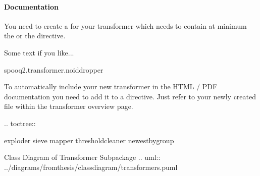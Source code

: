 \documentclass[a4paper,10pt, twoside,english]{sphinxmanual}
\begin{document}
\paragraph{Documentation}
\label{\detokenize{base_classes/transformer:documentation}}
You need to create a  for your transformer
which needs to contain at minimum the  or the  directive.
\def\sphinxLiteralBlockLabel{\label{\detokenize{base_classes/transformer:id4}}}
\begin{sphinxVerbatim}[commandchars=\\\{\}]

Some text if you like...

  spooq2.transformer.no\PYGZus{}id\PYGZus{}dropper
\end{sphinxVerbatim}

To automatically include your new transformer in the HTML / PDF documentation
you need to add it to a  directive. Just refer to your newly created
 file within the transformer overview page.
\def\sphinxLiteralBlockLabel{\label{\detokenize{base_classes/transformer:id5}}}
\begin{sphinxVerbatim}[commandchars=\\\{\}]
 .. toctree::

     exploder
     sieve
     mapper
     threshold\PYGZus{}cleaner
     newest\PYGZus{}by\PYGZus{}group

 Class Diagram of Transformer Subpackage
 \PYGZhy{}\PYGZhy{}\PYGZhy{}\PYGZhy{}\PYGZhy{}\PYGZhy{}\PYGZhy{}\PYGZhy{}\PYGZhy{}\PYGZhy{}\PYGZhy{}\PYGZhy{}\PYGZhy{}\PYGZhy{}\PYGZhy{}\PYGZhy{}\PYGZhy{}\PYGZhy{}\PYGZhy{}\PYGZhy{}\PYGZhy{}\PYGZhy{}\PYGZhy{}\PYGZhy{}\PYGZhy{}\PYGZhy{}\PYGZhy{}\PYGZhy{}\PYGZhy{}\PYGZhy{}\PYGZhy{}\PYGZhy{}\PYGZhy{}\PYGZhy{}\PYGZhy{}\PYGZhy{}\PYGZhy{}\PYGZhy{}\PYGZhy{}\PYGZhy{}\PYGZhy{}\PYGZhy{}\PYGZhy{}\PYGZhy{}\PYGZhy{}\PYGZhy{}\PYGZhy{}\PYGZhy{}
 .. uml:: ../diagrams/from\PYGZus{}thesis/class\PYGZus{}diagram/transformers.puml
\end{sphinxVerbatim}
\end{document}

